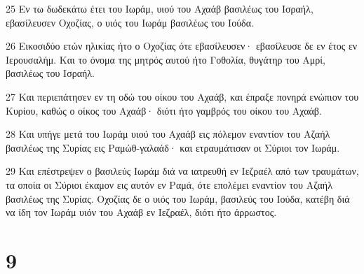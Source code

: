 \par 25 Εν τω δωδεκάτω έτει του Ιωράμ, υιού του Αχαάβ βασιλέως του Ισραήλ, εβασίλευσεν Οχοζίας, ο υιός του Ιωράμ βασιλέως του Ιούδα.
\par 26 Εικοσιδύο ετών ηλικίας ήτο ο Οχοζίας ότε εβασίλευσεν· εβασίλευσε δε εν έτος εν Ιερουσαλήμ. Και το όνομα της μητρός αυτού ήτο Γοθολία, θυγάτηρ του Αμρί, βασιλέως του Ισραήλ.
\par 27 Και περιεπάτησεν εν τη οδώ του οίκου του Αχαάβ, και έπραξε πονηρά ενώπιον του Κυρίου, καθώς ο οίκος του Αχαάβ· διότι ήτο γαμβρός του οίκου του Αχαάβ.
\par 28 Και υπήγε μετά του Ιωράμ υιού του Αχαάβ εις πόλεμον εναντίον του Αζαήλ βασιλέως της Συρίας εις Ραμώθ-γαλαάδ· και ετραυμάτισαν οι Σύριοι τον Ιωράμ.
\par 29 Και επέστρεψεν ο βασιλεύς Ιωράμ διά να ιατρευθή εν Ιεζραέλ από των τραυμάτων, τα οποία οι Σύριοι έκαμον εις αυτόν εν Ραμά, ότε επολέμει εναντίον του Αζαήλ βασιλέως της Συρίας. Οχοζίας δε ο υιός του Ιωράμ, βασιλεύς του Ιούδα, κατέβη διά να ίδη τον Ιωράμ υιόν του Αχαάβ εν Ιεζραέλ, διότι ήτο άρρωστος.

\chapter{9}

